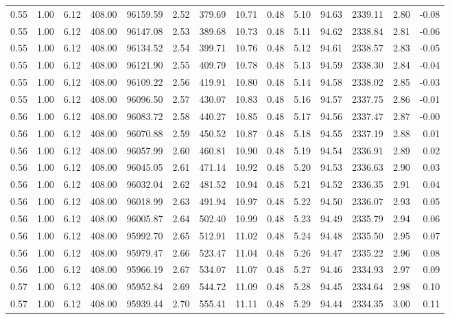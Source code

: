 \begin{table}[!ht]
\begin{tabular}{rrrrrrrrrrrrrr}
0.55 & 1.00 & 6.12 & 408.00 & 96159.59 & 2.52 & 379.69 & 10.71 & 0.48 & 5.10 & 94.63 & 2339.11 & 2.80 & -0.08 \\
0.55 & 1.00 & 6.12 & 408.00 & 96147.08 & 2.53 & 389.68 & 10.73 & 0.48 & 5.11 & 94.62 & 2338.84 & 2.81 & -0.06 \\
0.55 & 1.00 & 6.12 & 408.00 & 96134.52 & 2.54 & 399.71 & 10.76 & 0.48 & 5.12 & 94.61 & 2338.57 & 2.83 & -0.05 \\
0.55 & 1.00 & 6.12 & 408.00 & 96121.90 & 2.55 & 409.79 & 10.78 & 0.48 & 5.13 & 94.59 & 2338.30 & 2.84 & -0.04 \\
0.55 & 1.00 & 6.12 & 408.00 & 96109.22 & 2.56 & 419.91 & 10.80 & 0.48 & 5.14 & 94.58 & 2338.02 & 2.85 & -0.03 \\
0.55 & 1.00 & 6.12 & 408.00 & 96096.50 & 2.57 & 430.07 & 10.83 & 0.48 & 5.16 & 94.57 & 2337.75 & 2.86 & -0.01 \\
0.56 & 1.00 & 6.12 & 408.00 & 96083.72 & 2.58 & 440.27 & 10.85 & 0.48 & 5.17 & 94.56 & 2337.47 & 2.87 & -0.00 \\
0.56 & 1.00 & 6.12 & 408.00 & 96070.88 & 2.59 & 450.52 & 10.87 & 0.48 & 5.18 & 94.55 & 2337.19 & 2.88 & 0.01 \\
0.56 & 1.00 & 6.12 & 408.00 & 96057.99 & 2.60 & 460.81 & 10.90 & 0.48 & 5.19 & 94.54 & 2336.91 & 2.89 & 0.02 \\
0.56 & 1.00 & 6.12 & 408.00 & 96045.05 & 2.61 & 471.14 & 10.92 & 0.48 & 5.20 & 94.53 & 2336.63 & 2.90 & 0.03 \\
0.56 & 1.00 & 6.12 & 408.00 & 96032.04 & 2.62 & 481.52 & 10.94 & 0.48 & 5.21 & 94.52 & 2336.35 & 2.91 & 0.04 \\
0.56 & 1.00 & 6.12 & 408.00 & 96018.99 & 2.63 & 491.94 & 10.97 & 0.48 & 5.22 & 94.50 & 2336.07 & 2.93 & 0.05 \\
0.56 & 1.00 & 6.12 & 408.00 & 96005.87 & 2.64 & 502.40 & 10.99 & 0.48 & 5.23 & 94.49 & 2335.79 & 2.94 & 0.06 \\
0.56 & 1.00 & 6.12 & 408.00 & 95992.70 & 2.65 & 512.91 & 11.02 & 0.48 & 5.24 & 94.48 & 2335.50 & 2.95 & 0.07 \\
0.56 & 1.00 & 6.12 & 408.00 & 95979.47 & 2.66 & 523.47 & 11.04 & 0.48 & 5.26 & 94.47 & 2335.22 & 2.96 & 0.08 \\
0.56 & 1.00 & 6.12 & 408.00 & 95966.19 & 2.67 & 534.07 & 11.07 & 0.48 & 5.27 & 94.46 & 2334.93 & 2.97 & 0.09 \\
0.57 & 1.00 & 6.12 & 408.00 & 95952.84 & 2.69 & 544.72 & 11.09 & 0.48 & 5.28 & 94.45 & 2334.64 & 2.98 & 0.10 \\
0.57 & 1.00 & 6.12 & 408.00 & 95939.44 & 2.70 & 555.41 & 11.11 & 0.48 & 5.29 & 94.44 & 2334.35 & 3.00 & 0.11 \\

\end{tabular}
\end{table}
